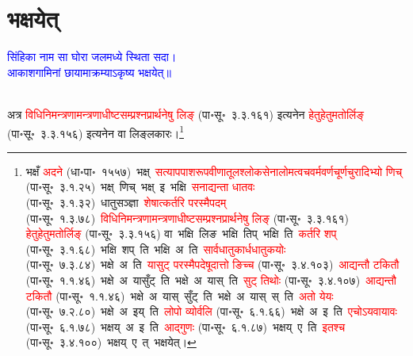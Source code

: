\section[भक्षयेत्]{भक्षयेत्}
\centering\textcolor{blue}{सिंहिका नाम सा घोरा जलमध्ये स्थिता सदा।\nopagebreak\\
आकाशगामिनां छायामाक्रम्याऽकृष्य भक्षयेत्॥}\nopagebreak\\
\\
\fontsize{14}{21}\selectfont\begin{sloppypar}\justifying\noindent\hspace{10mm} अत्र \textcolor{red}{विधि\-निमन्त्रणामन्त्रणाधीष्ट\-सम्प्रश्न\-प्रार्थनेषु लिङ्} (पा॰सू॰~३.३.१६१) इत्यनेन \textcolor{red}{हेतु\-हेतुमतोर्लिङ्} (पा॰सू॰~३.३.१५६) इत्यनेन वा लिङ्लकारः।\footnote{भक्षँ \textcolor{red}{अदने} (धा॰पा॰~१५५७)~\arrow भक्ष्~\arrow \textcolor{red}{सत्याप\-पाश\-रूप\-वीणा\-तूल\-श्लोक\-सेना\-लोम\-त्वच\-वर्म\-वर्ण\-चूर्ण\-चुरादिभ्यो णिच्} (पा॰सू॰~३.१.२५)~\arrow भक्ष्~णिच्~\arrow भक्ष्~इ~\arrow भक्षि~\arrow \textcolor{red}{सनाद्यन्ता धातवः} (पा॰सू॰~३.१.३२)~\arrow धातु\-सञ्ज्ञा~\arrow \textcolor{red}{शेषात्कर्तरि परस्मैपदम्} (पा॰सू॰~१.३.७८)~\arrow \textcolor{red}{विधि\-निमन्त्रणामन्त्रणाधीष्ट\-सम्प्रश्न\-प्रार्थनेषु लिङ्} (पा॰सू॰~३.३.१६१) \textcolor{red}{हेतु\-हेतुमतोर्लिङ्} (पा॰सू॰~३.३.१५६) वा~\arrow भक्षि~लिङ~\arrow भक्षि~तिप्~\arrow भक्षि~ति~\arrow \textcolor{red}{कर्तरि शप्‌} (पा॰सू॰~३.१.६८)~\arrow भक्षि~शप्~ति~\arrow भक्षि~अ~ति~\arrow \textcolor{red}{सार्वधातुकार्ध\-धातुकयोः} (पा॰सू॰~७.३.८४)~\arrow भक्षे~अ~ति~\arrow \textcolor{red}{यासुट् परस्मैपदेषूदात्तो ङिच्च} (पा॰सू॰~३.४.१०३)~\arrow \textcolor{red}{आद्यन्तौ टकितौ} (पा॰सू॰~१.१.४६)~\arrow भक्षे~अ~यासुँट्~ति~\arrow भक्षे~अ~यास्~ति~\arrow \textcolor{red}{सुट् तिथोः} (पा॰सू॰~३.४.१०७)~\arrow \textcolor{red}{आद्यन्तौ टकितौ} (पा॰सू॰~१.१.४६)~\arrow भक्षे~अ~यास्~सुँट्~ति~\arrow भक्षे~अ~यास्~स्~ति~\arrow \textcolor{red}{अतो येयः} (पा॰सू॰~७.२.८०)~\arrow भक्षे~अ~इय्~ति~\arrow \textcolor{red}{लोपो व्योर्वलि} (पा॰सू॰~६.१.६६)~\arrow भक्षे~अ~इ~ति~\arrow \textcolor{red}{एचोऽयवायावः} (पा॰सू॰~६.१.७८)~\arrow भक्षय्~अ~इ~ति~\arrow \textcolor{red}{आद्गुणः} (पा॰सू॰~६.१.८७)~\arrow भक्षय्~ए~ति~\arrow \textcolor{red}{इतश्च} (पा॰सू॰~३.४.१००)~\arrow भक्षय्~ए~त्~\arrow भक्षयेत्।}\end{sloppypar}
\label{sec:prasarayat}
